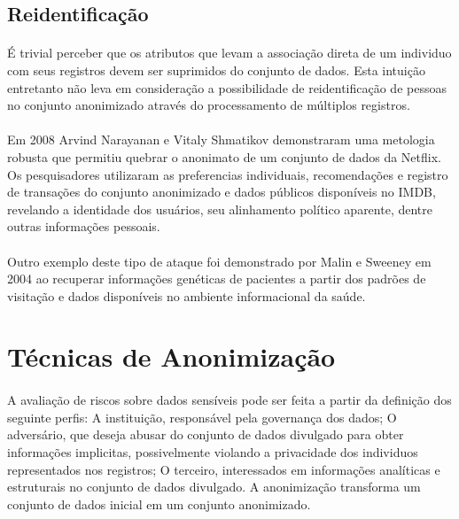 \subsection{Reidentificação}

\paragraph{} É trivial perceber que os atributos que levam a associação direta de um individuo com seus registros devem ser suprimidos do conjunto de dados. Esta intuição entretanto não leva em consideração a possibilidade de reidentificação de pessoas no conjunto anonimizado através do processamento de múltiplos registros.

\paragraph{} Em 2008 Arvind Narayanan e Vitaly Shmatikov demonstraram uma metologia robusta\cite{netflixDeanon}  que permitiu quebrar o anonimato de um conjunto de dados da Netflix. Os pesquisadores utilizaram as preferencias individuais, recomendações e registro de transações do conjunto anonimizado e dados públicos disponíveis no IMDB, revelando a identidade dos usuários, seu alinhamento político aparente, dentre outras informações pessoais.

\paragraph{} Outro exemplo deste tipo de ataque foi demonstrado por Malin e Sweeney\cite{malin2004} em 2004 ao recuperar informações genéticas de pacientes a partir dos padrões de visitação e dados disponíveis no ambiente informacional da saúde.

\section{Técnicas de Anonimização}

\paragraph{} A avaliação de riscos sobre dados sensíveis pode ser feita a partir da definição dos seguinte perfis: A instituição, responsável pela governança dos dados; O adversário, que deseja abusar do conjunto de dados divulgado para obter informações implicitas, possivelmente violando a privacidade dos individuos representados nos registros; O terceiro, interessados em informações analíticas e estruturais no conjunto de dados divulgado. A anonimização transforma um conjunto de dados inicial em um conjunto anonimizado.

